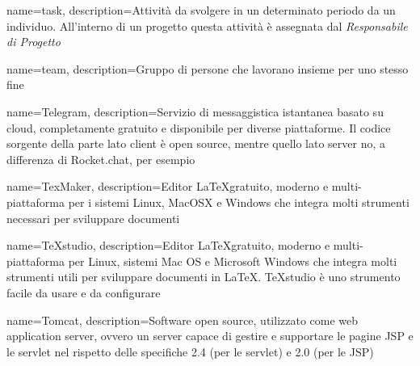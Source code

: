

{
	name=task,
	description={Attività da svolgere in un determinato periodo da un individuo. All'interno di un progetto questa attività è assegnata dal \textit{Responsabile di Progetto}}
}

{
	name=team,
	description={Gruppo di persone che lavorano insieme per uno stesso fine}
}

{
	name=Telegram,
	description={Servizio di messaggistica istantanea basato su cloud, completamente gratuito e disponibile per diverse piattaforme. Il codice sorgente della parte lato client è open source, mentre quello lato server no, a differenza di Rocket.chat, per esempio}
}

{
	name=TexMaker,
	description={Editor \LaTeX gratuito, moderno e multi-piattaforma per i sistemi Linux, MacOSX e Windows che integra molti strumenti necessari per sviluppare documenti}
}

{
	name=TeXstudio,
	description={Editor \LaTeX gratuito, moderno e multi-piattaforma per Linux, sistemi Mac OS e Microsoft Windows che integra molti strumenti utili per sviluppare documenti in \LaTeX. TeXstudio è uno strumento facile da usare e da configurare}
}

{
	name=Tomcat,
	description={Software open source, utilizzato come web application server, ovvero un server capace di gestire e supportare le pagine JSP e le servlet nel rispetto delle specifiche 2.4 (per le servlet) e 2.0 (per le JSP)}
}



